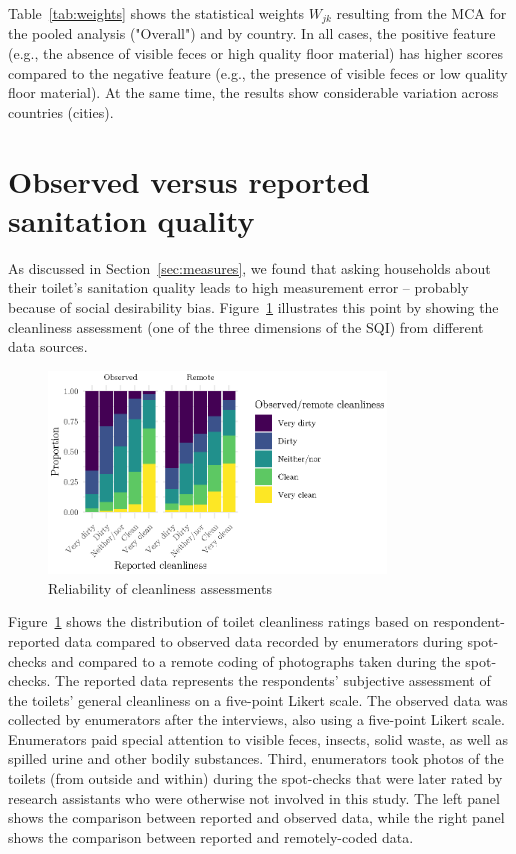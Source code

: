 \documentclass[natbib]{svjour3}                     %
\begin{document}
Table~\ref{tab:weights} shows the statistical weights $W_{jk}$ resulting from the MCA for the pooled analysis ("Overall") and by country. In all cases, the positive feature (e.g., the absence of visible feces or high quality floor material) has higher scores compared to the negative feature (e.g., the presence of visible feces or low quality floor material). At the same time, the results show considerable variation across countries (cities).


\section{Observed versus reported sanitation quality} 
\label{sec:reliability}
As discussed in Section~\ref{sec:measures}, we found that asking households about their toilet’s sanitation quality leads to high measurement error -- probably because of social desirability bias. Figure~\ref{fig:reliability} illustrates this point by showing the cleanliness assessment (one of the three dimensions of the SQI) from different data sources.

\begin{figure}[htbp]
    \centering
    \includegraphics[width=0.8\textwidth]{figures/reliability.eps}
    \caption{Reliability of cleanliness assessments}
    \label{fig:reliability}
\end{figure}

Figure~\ref{fig:reliability} shows the distribution of toilet cleanliness ratings based on respondent-reported data compared to observed data recorded by enumerators during spot-checks and compared to a remote coding of photographs taken during the spot-checks. The reported data represents the respondents' subjective assessment of the toilets' general cleanliness on a five-point Likert scale. The observed data was collected by enumerators after the interviews, also using a five-point Likert scale. Enumerators paid special attention to visible feces, insects, solid waste, as well as spilled urine and other bodily substances. Third,  enumerators took photos of the toilets (from outside and within) during the spot-checks that were later rated by research assistants who were otherwise not involved in this study. The left panel shows the comparison between reported and observed data, while the right panel shows the comparison between reported and remotely-coded data.
\end{document}
